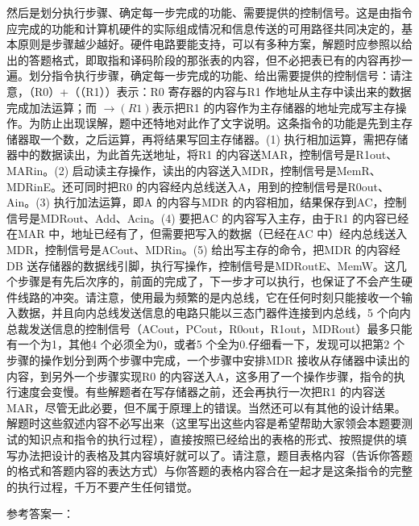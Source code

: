 \documentclass[UTF8,11pt]{ctexart}
\begin{document}
然后是划分执行步骤、确定每一步完成的功能、需要提供的控制信号。这是由指令应完成的功能和计算机硬件的实际组成情况和信息传送的可用路径共同决定的，基本原则是步骤越少越好。硬件电路要能支持，可以有多种方案，解题时应参照以给出的答题格式，即取指和译码阶段的那张表的内容，但不必把表已有的内容再抄一遍。划分指令执行步骤，确定每一步完成的功能、给出需要提供的控制信号：请注意，（R0）+（（R1））表示：R0 寄存器的内容与R1 作地址从主存中读出来的数据完成加法运算；而 \(\displaystyle \to(R1)\)表示把R1 的内容作为主存储器的地址完成写主存操作。为防止出现误解，题中还特地对此作了文字说明。这条指令的功能是先到主存储器取一个数，之后运算，再将结果写回主存储器。(1) 执行相加运算，需把存储器中的数据读出，为此首先送地址，将R1 的内容送MAR，控制信号是R1out、MARin。(2) 启动读主存操作，读出的内容送入MDR，控制信号是MemR、MDRinE。还可同时把R0 的内容经内总线送入A，用到的控制信号是R0out、Ain。(3) 执行加法运算，即A 的内容与MDR 的内容相加，结果保存到AC，控制信号是MDRout、Add、Acin。(4) 要把AC 的内容写入主存，由于R1 的内容已经在MAR 中，地址已经有了，但需要把写入的数据（已经在AC 中）经内总线送入MDR，控制信号是ACout、MDRin。(5) 给出写主存的命令，把MDR 的内容经DB 送存储器的数据线引脚，执行写操作，控制信号是MDRoutE、MemW。这几个步骤是有先后次序的，前面的完成了，下一步才可以执行，也保证了不会产生硬件线路的冲突。请注意，使用最为频繁的是内总线，它在任何时刻只能接收一个输入数据，并且向内总线发送信息的电路只能以三态门器件连接到内总线，5 个向内总裁发送信息的控制信号（ACout，PCout，R0out，R1out，MDRout）最多只能有一个为1，其他4 个必须全为0，或者5 个全为0.仔细看一下，发现可以把第2 个步骤的操作划分到两个步骤中完成，一个步骤中安排MDR 接收从存储器中读出的内容，到另外一个步骤实现R0 的内容送入A，这多用了一个操作步骤，指令的执行速度会变慢。有些解题者在写存储器之前，还会再执行一次把R1 的内容送MAR，尽管无此必要，但不属于原理上的错误。当然还可以有其他的设计结果。解题时这些叙述内容不必写出来（这里写出这些内容是希望帮助大家领会本题要测试的知识点和指令的执行过程），直接按照已经给出的表格的形式、按照提供的填写办法把设计的表格及其内容填好就可以了。请注意，题目表格内容（告诉你答题的格式和答题内容的表达方式）与你答题的表格内容合在一起才是这条指令的完整的执行过程，千万不要产生任何错觉。


参考答案一：
\end{document}
